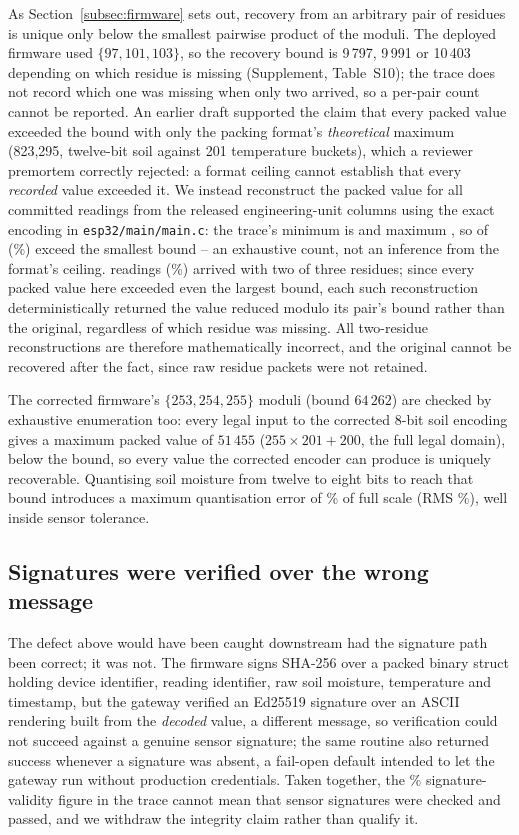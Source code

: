 \documentclass[a4paper,fleqn]{cas-sc}
\begin{document}
As Section~\ref{subsec:firmware} sets out, recovery from an arbitrary pair
of residues is unique only below the smallest pairwise product of the
moduli. The deployed firmware used $\{97, 101, 103\}$, so the recovery
bound is 9\,797, 9\,991 or 10\,403 depending on which residue is missing
(Supplement, Table~S10); the trace does not record which one was missing
when only two arrived, so a per-pair count cannot be reported. An earlier
draft supported the claim that every packed value exceeded the bound with
only the packing format's \emph{theoretical} maximum (823,295, twelve-bit
soil against 201 temperature buckets), which a reviewer premortem
correctly rejected: a format ceiling cannot establish that every
\emph{recorded} value exceeded it. We instead reconstruct the packed
value for all \CRTExceedN{} committed readings from the released
engineering-unit columns using the exact encoding in
\texttt{esp32/main/main.c}: the trace's minimum is \CRTPackedMin{} and
maximum \CRTPackedMax{}, so \CRTExceedCount{} of \CRTExceedN{}
(\CRTExceedPct\%) exceed the smallest bound -- an exhaustive count, not an
inference from the format's ceiling. \CRTRecovered{} readings
(\CRTLossRatePct\%) arrived with two of three residues; since every
packed value here exceeded even the largest bound, each such
reconstruction deterministically returned the value reduced modulo its
pair's bound rather than the original, regardless of which residue was
missing. All \CRTRecovered{} two-residue reconstructions are therefore
mathematically incorrect, and the original cannot be recovered after the
fact, since raw residue packets were not retained.

The corrected firmware's $\{253, 254, 255\}$ moduli (bound $64\,262$) are
checked by exhaustive enumeration too: every legal input to the corrected
8-bit soil encoding gives a maximum packed value of $51\,455$
($255 \times 201 + 200$, the full legal domain), below the bound, so
every value the corrected encoder can produce is uniquely recoverable.
Quantising soil moisture from twelve to eight bits to reach that bound
introduces a maximum quantisation error of \QuantErrMaxPct\% of full
scale (RMS \QuantErrRMSPct\%), well inside sensor tolerance.

\subsection{Signatures were verified over the wrong message}
\label{subsec:pm_signature}

The defect above would have been caught downstream had the signature path
been correct; it was not. The firmware signs SHA-256 over a packed binary
struct holding device identifier, reading identifier, raw soil moisture,
temperature and timestamp, but the gateway verified an Ed25519 signature
over an ASCII rendering built from the \emph{decoded} value, a different
message, so verification could not succeed against a genuine sensor
signature; the same routine also returned success whenever a signature
was absent, a fail-open default intended to let the gateway run without
production credentials. Taken together, the \SigValidPct\%
signature-validity figure in the trace cannot mean that sensor signatures
were checked and passed, and we withdraw the integrity claim rather than
qualify it.
\end{document}
